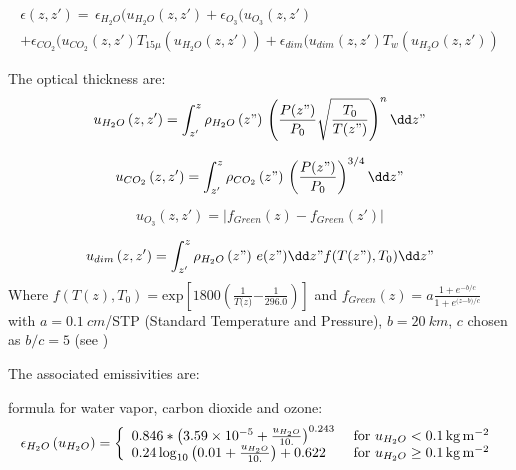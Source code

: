 \begin{multline}
\epsilon \left( z,z' \right)=
\, \epsilon_{H_{2}O}(u_{H_{2}O}\left(z,z' \right)
+\epsilon_{O_{3}}(u_{O_{3}}\left( z,z' \right)\\
+\epsilon_{CO_{2}}(u_{CO_{2}}\left( z,z' \right)T_{15\mu }\left( u_{H_{2}O}\left( z,z'
\right) \right)+\epsilon_{dim}(u_{dim}\left( z,z' \right)T_{w}\left(
u_{H_{2}O}\left( z,z' \right) \right)
\end{multline}

The optical thickness are:
\begin{equation}
u_{H_{2}O}\left( z,z' \right)=\int_{z'}^{z} \rho_{H_{2}O} \left( z" \right)\,
\left( \frac{P(z")}{P_{0}}\sqrt \frac{T_{0}}{T(z")} \right)^{n}\dd z"
\end{equation}

\begin{equation}
u_{CO_{2}}\left( z,z' \right)=\int_{z'}^{z} \rho_{CO_{2}} \left( z" \right)\,
\left( \frac{P(z")}{P_{0}} \right)^{3/4}\dd z"
\end{equation}

\begin{equation}
u_{O_{3}}\left( z,z' \right)=\left| f_{Green}\left( z
\right)-f_{Green}(z') \right|
\end{equation}

\begin{equation}
u_{dim}\left( z,z' \right)=\int_{z'}^{z} \rho_{H_{2}O} \left( z" \right)\,
e(z")\dd z"f(T(z"),T_{0})\dd z"
\end{equation}
Where $f\left( T\left( z \right)\mathrm{,}T_{\mathrm{0}}
\right)\mathrm{=exp}\left[ \mathrm{1800}\left(
\frac{\mathrm{1}}{T\mathrm{(}z\mathrm{)}}\mathrm{-}\frac{\mathrm{1}}{\mathrm{296.0}}
\right) \right]$ and $f_{Green}\left( z
\right)\mathrm{=}a\frac{\mathrm{1+}e^{\mathrm{-}b\mathrm{/}c}}{\mathrm{1+}e^{\mathrm{(}z\mathrm{-}b\mathrm{)/}c}}$
\newline
with $a=\SI{0.1}{cm}$/STP (Standard Temperature and Pressure), $b= \SI{20}{km}$,
\newline
$c$ chosen as $b/c=5$ (see \cite{Green:1964})

The associated emissivities are:

\cite{Sasamori:1968} formula for water vapor, carbon dioxide and ozone:
\begin{equation}
\epsilon_{H_{2}O}\left( u_{H_{2}O} \right)=\left\{
{\begin{array}{l l}
  0.846\ast \left( 3.59\times {10}^{-5}+\frac{u_{H_{2}O}}{10.} \right)^{0.243}
  &\text{ for } u_{H_{2}O}< \SI{0.1}{kg.m^{-2}} \\
  0.24\, {\log}_{10}\left( 0.01+\frac{u_{H_{2}O}}{10.} \right)+0.622
  &\text{ for } u_{H_{2}O}\ge \SI{0.1}{ kg.m^{-2}}
\end{array}} \right.
\end{equation}

